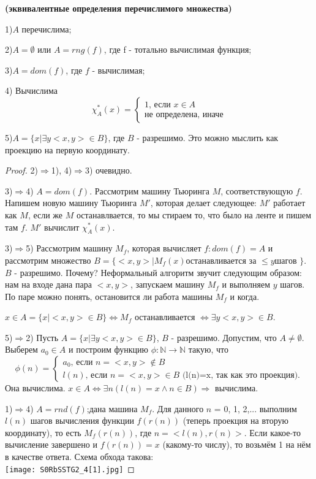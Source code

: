 \begin{theorem}{\textbf{(эквивалентные определения перечислимого множества)}}
	\par 1)$A$ перечислима;
	\par 2)$A = \emptyset $ или $A = rng(f)$, где f - тотально вычислимая функция;
	\par 3)$A = dom(f)$, где $f$ - вычислимая;
	\par 4) Вычислима \begin{equation*}
		\chi^*_{A}(x) = 
		\begin{cases}
			\text{1, если $x \in A$}\\
			\text{не определена, иначе}
		\end{cases}
	\end{equation*}
	\par 5)$A = \{ x| \exists y <x,y> \in B \}$, где $B$ - разрешимо. Это можно мыслить как проекцию на первую координату.
	\begin{proof}

		\par2)$\Rightarrow$1), 4)$\Rightarrow$3) очевидно.
		\par3)$\Rightarrow$4) $A=dom(f)$. Рассмотрим машину Тьюринга $M$, соответствующую $f$. Напишем новую машину
		Тьюринга $M'$, которая делает следующее: $M'$ работает как $M$, если же $M$ останавлвается, то мы стираем то,
		что было на ленте и пишем там $f$. $M'$ вычислит $\chi^*_{A}(x)$.  
		\par3)$\Rightarrow$5) Рассмотрим машину $M_{f}$, которая вычисляет $f: dom(f)=A$ и рассмотрим множество $B =
		\{<x,y>| M_{f}(x) \mbox{останавливается за }\leq y \mbox{шагов }\}$. $B$ - разрешимо. Почему?
		Неформальный алгоритм звучит следующим образом: нам на входе дана пара $<x,y>$, запускаем машину $M_{f}$ и
		выполняем $y$ шагов. По паре можно понять, остановится ли работа машины $M_{f}$ и когда.
		\par $x \in A = \{ x| <x,y> \in B \} \iff M_{f}$ останавливается $\iff \exists y <x,y> \in B $.
		\par5)$\Rightarrow$2) Пусть $A = \{ x| \exists y <x,y> \in B \}$, $B$ - разрешимо. Допустим, что $A \neq
		\emptyset$. Выберем $a_{0} \in A$ и построим функцию $\phi: \mathbb{N} \to \mathbb{N}$ такую, что 
		\begin{equation*}
			\phi(n) = 
			\begin{cases}
				a_{0}\text{, если $n=<x,y> \notin B$}\\
				l(n)\text{, если $n=<x,y> \in B$ (l(n)=x, так как это проекция)}.
			\end{cases}
		\end{equation*}
		Она вычислима. $x \in A \iff \exists n (l(n)=x \land n \in B) \Rightarrow$ вычислима.
		\par1)$\Rightarrow$4) $A = rnd(f)$;дана машина $M_{f}$. Для данного $n$ = 0, 1, 2,... выполним $l(n)$ шагов
		вычисления функции $f(r(n))$ (теперь проекция на вторую координату), то есть $M_{f}(r(n))$, где $n = <l(n),
		r(n)>$. Если какое-то вычисление завершено и $f(r(n))=x$ (какому-то числу), то возьмём 1 на нём в качестве
		ответа. Схема обхода такова: \\ 
		\texttt{[image: S0RbSSTG2\_4[1].jpg]}
	\end{proof}
\end{theorem}
